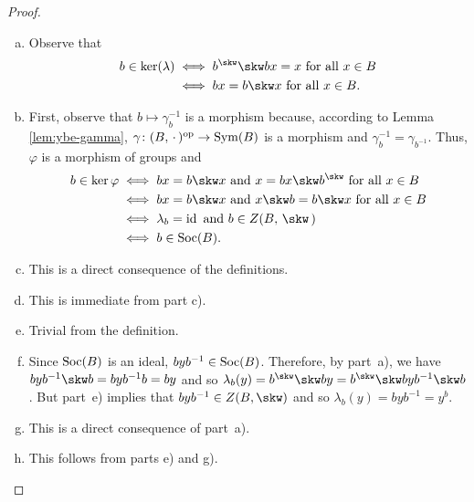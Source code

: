 \begin{proof}${}$
    \begin{enumerate}[a),font=\upshape]
        \item Observe that
        \begin{align*}
            b\in\ker(\lambda)
                &\iff b^\skw\skw bx=x\text{ for all }x\in B
                    \nonumber\\
                &\iff bx = b\skw x\text{ for all }x\in B. 
        \end{align*}

        \item %
        
        First, observe that $b\mapsto\gamma_b^{-1}$ is a morphism because, according to Lemma \ref{lem:ybe-gamma}, $\gamma\colon(B,\,\cdot\,)^{\operatorname{op}}\to{\rm Sym}(B)$ is a morphism and $\gamma_b^{-1}=\gamma_{b^{-1}}$. Thus, $\varphi$ is a morphism of groups and
        \begin{align*}
            b \in\ker\varphi
                &\iff bx=b\skw x
                    \text{ and }
                    x=bx\skw b^\skw
                    \text{ for all }x\in B\\
                &\iff bx = b\skw x
                    \text{ and }
                    x\skw b = b\skw x
                    \text{ for all }x\in B\\
                &\iff \lambda_b=\id
                    \text{ and }
                    b\in Z(B,\,\skw\,)\\
                &\iff b\in\Soc(B).
        \end{align*}

        \item This is a direct consequence of the definitions.

        \item This is immediate from part c).

        \item Trivial from the definition.

        \item Since ${\rm Soc}(B)$ is an ideal, $byb^{-1}\in{\rm Soc}(B)$. Therefore, by part~a), we have $byb^{-1}\skw b=byb^{-1}b=by$ and so $\lambda_b(y)=b^\skw\skw by=b^\skw\skw byb^{-1}\skw b$. But part~e) implies that $byb^{-1}\in Z(B,\skw)$ and so $\lambda_b(y) = byb^{-1}=y^b$.

        \item This is a direct consequence of part~a).

        \item This follows from parts e) and g).
    \end{enumerate}
\end{proof}



